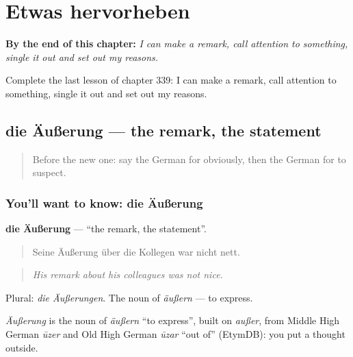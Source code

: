 
\chapter{Etwas hervorheben}
\label{ch:ge-etwas-hervorheben}

\begin{chapteropening}
\textbf{By the end of this chapter:} \emph{I can make a remark, call attention to something, single it out and set out my reasons.}

Complete the last lesson of chapter 339: I can make a remark, call attention to something, single it out and set out my reasons.
\end{chapteropening}

\section[die Äußerung]{die Äußerung — the remark, the statement}

\label{lesson:GE-C339-aeusserung}



\begin{quote}
Before the new one: say the German for obviously, then the German for to suspect.
\end{quote}

\subsection*{You'll want to know: die Äußerung}
\textbf{die Äußerung} — \textquotedblleft{}the remark, the statement\textquotedblright{}.

\begin{quote}
Seine Äußerung über die Kollegen war nicht nett.
\end{quote}

\begin{quote}
\emph{His remark about his colleagues was not nice.}
\end{quote}

Plural: \emph{die Äußerungen}. The noun of \emph{äußern} — to express.

\begin{cousinweb}
\emph{Äußerung} is the noun of \emph{äußern} \textquotedblleft{}to express\textquotedblright{}, built on \emph{außer}, from Middle High German \emph{ūzer} and Old High German \emph{ūzar} \textquotedblleft{}out of\textquotedblright{} (EtymDB): you put a thought outside.
\end{cousinweb}


